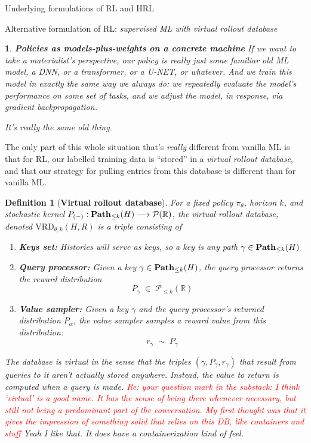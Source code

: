 \documentclass[11pt]{article}
\newtheorem{definition}[subsubsection]{Definition}
\newtheorem{ermark}[subsubsection]{}
\begin{document}
\begin{section}{Underlying formulations of RL and HRL}
\begin{subsection}{Alternative formulation of RL: {\em supervised ML with virtual rollout database}}
\begin{ermark}
{\bf Policies as models-plus-weights on a concrete machine}
\normalfont
If we want to take a materialist's perspective, our policy is {\em really} just some familiar old ML model, a DNN, or a transformer, or a U-NET, or whatever.  And we train this model in exactly the same way we always do: we repeatedly evaluate the model’s performance on some set of tasks, and we adjust the model, in response, via gradient backpropagation.

It’s really the same old thing. 
\end{ermark}

The only part of this whole situation that’s {\em really} different from vanilla ML is that for RL, our labelled training data is ``stored'' in a {\em virtual rollout database}, and that our strategy for pulling entries from this database is different than for vanilla ML.

\begin{definition}[{\bf Virtual rollout database}]
\normalfont
For a fixed policy $\pi_\theta$, horizon $k$, and stochastic kernel $P_{(-)}:\bold{Path}_{\le k}(H)\longrightarrow\mathcal{P}(\mathbb{R})$, the {\em virtual rollout database}, denoted $\text{VRD}_{\theta,k}(H,R)$ is a triple  consisting of
\begin{enumerate}
\item {\bf Keys set:} Histories will serve as {\em keys}, so a key is any path $\gamma\in\bold{Path}_{\le k}(H)$
\item {\bf Query processor:} Given a key $\gamma\in\bold{Path}_{\le k}(H)$, the {\em query processor} returns the reward distribution
$$
P_{\gamma}\;\in\;\mathcal{P}_{\le k}(\mathbb{R})
$$
\item {\bf Value sampler:} Given a key $\gamma$ and the query processor's returned distribution $P_{\alpha}$, the {\em value sampler} samples a reward value from this distribution:
$$
r_{\gamma}\;\sim\;P_{\gamma}
$$
\end{enumerate}
The database is {\em virtual} in the sense that the triples $(\gamma,P_{\gamma},r_\gamma)$ that result from queries to it aren't actually stored anywhere. Instead, the value to return is computed when a query is made. 
\textcolor{red}{Re: your question mark in the substack: I think `virtual' is a good name. It has the sense of being there whenever necessary, but still not being a predominant part of the conversation. My first thought was that it gives the impression of something solid that relies on this DB, like containers and stuff} {\color{blue} Yeah I like that. It does have a containerization kind of feel.}


\end{definition}
\end{subsection}
\end{section}
\end{document}
